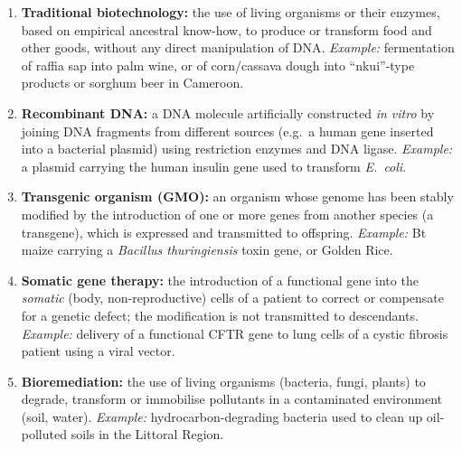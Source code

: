\documentclass[11pt]{article}
\begin{document}
\begin{corrige}
\begin{enumerate}
\item \textbf{Traditional biotechnology:} the use of living organisms or their enzymes, based on empirical ancestral know-how, to produce or transform food and other goods, without any direct manipulation of DNA. \emph{Example:} fermentation of raffia sap into palm wine, or of corn/cassava dough into ``nkui''-type products or sorghum beer in Cameroon.
\item \textbf{Recombinant DNA:} a DNA molecule artificially constructed \emph{in vitro} by joining DNA fragments from different sources (e.g.\ a human gene inserted into a bacterial plasmid) using restriction enzymes and DNA ligase. \emph{Example:} a plasmid carrying the human insulin gene used to transform \emph{E.~coli}.
\item \textbf{Transgenic organism (GMO):} an organism whose genome has been stably modified by the introduction of one or more genes from another species (a transgene), which is expressed and transmitted to offspring. \emph{Example:} Bt maize carrying a \emph{Bacillus thuringiensis} toxin gene, or Golden Rice.
\item \textbf{Somatic gene therapy:} the introduction of a functional gene into the \emph{somatic} (body, non-reproductive) cells of a patient to correct or compensate for a genetic defect; the modification is not transmitted to descendants. \emph{Example:} delivery of a functional CFTR gene to lung cells of a cystic fibrosis patient using a viral vector.
\item \textbf{Bioremediation:} the use of living organisms (bacteria, fungi, plants) to degrade, transform or immobilise pollutants in a contaminated environment (soil, water). \emph{Example:} hydrocarbon-degrading bacteria used to clean up oil-polluted soils in the Littoral Region.
\end{enumerate}
\end{corrige}
\end{document}

